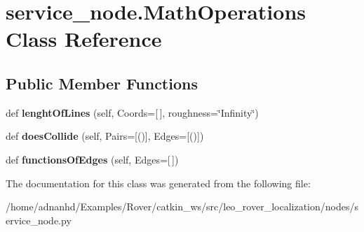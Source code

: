 \hypertarget{classservice__node_1_1MathOperations}{}\section{service\+\_\+node.\+Math\+Operations Class Reference}
\label{classservice__node_1_1MathOperations}
\subsection*{Public Member Functions}
\begin{DoxyCompactItemize}
\item 
\mbox{\label{classservice__node_1_1MathOperations_af40dad96f5992cbd8ea64793050ca100}} 
def {\bfseries lenght\+Of\+Lines} (self, Coords=\mbox{[}$\,$\mbox{]}, roughness=\char`\"{}Infinity\char`\"{})
\item 
\mbox{\label{classservice__node_1_1MathOperations_a44c83fcab4c8fbed72c5b4a284441c7e}} 
def {\bfseries does\+Collide} (self, Pairs=\mbox{[}()\mbox{]}, Edges=\mbox{[}()\mbox{]})
\item 
\mbox{\label{classservice__node_1_1MathOperations_ace96f7bbddc5b3f76973f7cfc792e043}} 
def {\bfseries functions\+Of\+Edges} (self, Edges=\mbox{[}$\,$\mbox{]})
\end{DoxyCompactItemize}


The documentation for this class was generated from the following file\+:\begin{DoxyCompactItemize}
\item 
/home/adnanhd/\+Examples/\+Rover/catkin\+\_\+ws/src/leo\+\_\+rover\+\_\+localization/nodes/service\+\_\+node.\+py\end{DoxyCompactItemize}
